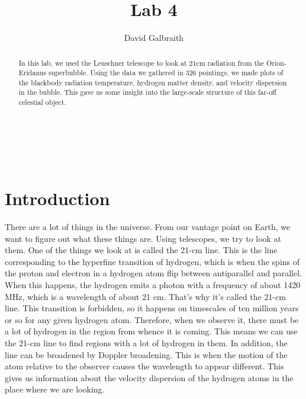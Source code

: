 \documentclass[11pt]{article}
\begin{document}
\title{Lab 4}
\author{David Galbraith}
\maketitle

\normalsize
\begin{abstract} 
In this lab, we used the Leuschner telescope to look at 21cm radiation from the Orion-Eridanus superbubble. Using the data we gathered in 326 pointings, we made plots of the blackbody radiation temperature, hydrogen matter density, and velocity dispersion in the bubble. This gave us some insight into the large-scale structure of this far-off celestial object.

\end{abstract}


\medskip                        %

\thispagestyle{plain}

\section{Introduction}
There are a lot of things in the universe. From our vantage point on Earth, we want to figure out what these things are. Using telescopes, we try to look at them. One of the things we look at is called the 21-cm line. This is the line corresponding to the hyperfine transition of hydrogen, which is when the spins of the proton and electron in a hydrogen atom flip between antiparallel and parallel. When this happens, the hydrogen emits a photon with a frequency of about 1420 MHz, which is a wavelength of about 21 cm. That's why it's called the 21-cm line. This transition is forbidden, so it happens on timescales of ten million years or so for any given hydrogen atom. Therefore, when we observe it, there must be a lot of hydrogen in the region from whence it is coming. This means we can use the 21-cm line to find regions with a lot of hydrogen in them. In addition, the line can be broadened by Doppler broadening. This is when the motion of the atom relative to the observer causes the wavelength to appear different. This gives us information about the velocity dispersion of the hydrogen atoms in the place where we are looking. 
\end{document}
